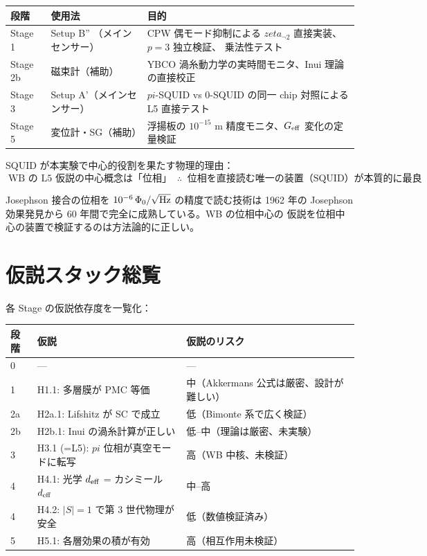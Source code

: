 \documentclass[11pt,a4paper]{article}
\def\pi{pi}%
\def\zeta{zeta}%
\def\textbf#1{#1}%
\begin{document}
\begin{center}
\renewcommand{\arraystretch}{1.3}
\begin{tabular}{p{}p{}p{}}
\toprule
段階 & 使用法 & 目的 \\
\midrule
Stage 1 & Setup B'' （メインセンサー） &
  CPW 偶モード抑制による $\zeta_{\neg 2}$ 直接実装、$p=3$ 独立検証、
  乗法性テスト \\
\midrule
Stage 2b & 磁束計（補助） &
  YBCO 渦糸動力学の実時間モニタ、Inui 理論の直接校正 \\
\midrule
Stage 3 & Setup A'（メインセンサー） &
  $\pi$-SQUID vs 0-SQUID の同一 chip 対照による L5 直接テスト \\
\midrule
Stage 5 & 変位計・SG（補助） &
  浮揚板の $10^{-15}$ m 精度モニタ、$G_{\rm eff}$ 変化の定量検証 \\
\bottomrule
\end{tabular}
\end{center}

\textbf{SQUID が本実験で中心的役割を果たす物理的理由}：
\[
\boxed{\;\text{WB の L5 仮説の中心概念は「位相」}\;\;\therefore\;\;
\text{位相を直接読む唯一の装置（SQUID）が本質的に最良}\;}
\]

Josephson 接合の位相を $10^{-6}\,\Phi_0/\sqrt{\rm Hz}$ の精度で読む技術は
1962 年の Josephson 効果発見から 60 年間で完全に成熟している。WB の位相中心の
仮説を位相中心の装置で検証するのは方法論的に正しい。

\newpage

\section{仮説スタック総覧}

各 Stage の仮説依存度を一覧化：

\begin{center}
\renewcommand{\arraystretch}{1.3}
\begin{tabular}{p{}p{}p{}}
\toprule
段階 & 仮説 & 仮説のリスク \\
\midrule
0 & --- & --- \\
1 & H1.1: 多層膜が PMC 等価 & 中（Akkermans 公式は厳密、設計が難しい） \\
2a & H2a.1: Lifshitz が SC で成立 & 低（Bimonte 系で広く検証） \\
2b & H2b.1: Inui の渦糸計算が正しい & 低--中（理論は厳密、未実験） \\
\textbf{3} & \textbf{H3.1 (=L5): $\pi$ 位相が真空モードに転写} &
  \textbf{高（WB 中核、未検証）} \\
4 & H4.1: 光学 $d_{\rm eff}$ = カシミール $d_{\rm eff}$ & 中--高 \\
4 & H4.2: $|S|=1$ で第 3 世代物理が安全 & 低（数値検証済み） \\
5 & H5.1: 各層効果の積が有効 & 高（相互作用未検証） \\
\bottomrule
\end{tabular}
\end{center}
\end{document}
